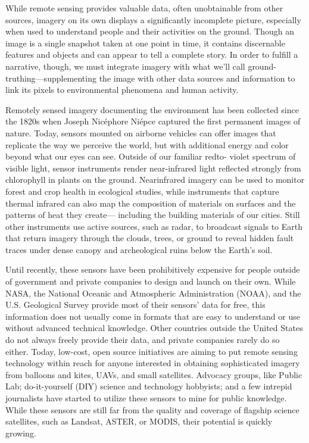 \begin{itemize}
\begin{itemized}
While remote sensing provides valuable data, often unobtainable from
other sources, imagery on its own displays a significantly incomplete picture,
especially when used to understand people and their activities on the
ground. Though an image is a single snapshot taken at one point in time, it
contains discernable features and objects and can appear to tell a complete
story. In order to fulfill a narrative, though, we must integrate imagery with
what we'll call ground-truthing—supplementing the image with other data
sources and information to link its pixels to environmental phenomena and
human activity.

Remotely sensed imagery documenting the environment has been collected
since the 1820s when Joseph Nicéphore Niépce captured the first permanent
images of nature. Today, sensors mounted on airborne vehicles can
offer images that replicate the way we perceive the world, but with additional
energy and color beyond what our eyes can see. Outside of our familiar redto-
violet spectrum of visible light, sensor instruments render near-infrared
light reflected strongly from chlorophyll in plants on the ground. Nearinfrared
imagery can be used to monitor forest and crop health in ecological
studies, while instruments that capture thermal infrared can also map
the composition of materials on surfaces and the patterns of heat they create—
including the building materials of our cities. Still other instruments
use active sources, such as radar, to broadcast signals to Earth that return
imagery through the clouds, trees, or ground to reveal hidden fault traces
under dense canopy and archeological ruins below the Earth's soil.

Until recently, these sensors have been prohibitively expensive for people
outside of government and private companies to design and launch on their
own. While NASA, the National Oceanic and Atmospheric Administration
(NOAA), and the U.S. Geological Survey provide most of their sensors' data
for free, this information does not usually come in formats that are easy to understand or use without advanced technical knowledge. Other countries
outside the United States do not always freely provide their data, and private
companies rarely do so either. Today, low-cost, open source initiatives
are aiming to put remote sensing technology within reach for anyone interested
in obtaining sophisticated imagery from balloons and kites, UAVs, and
small satellites. Advocacy groups, like Public Lab; do-it-yourself (DIY) science
and technology hobbyists; and a few intrepid journalists have started
to utilize these sensors to mine for public knowledge. While these sensors
are still far from the quality and coverage of flagship science satellites, such
as Landsat, ASTER, or MODIS, their potential is quickly growing.


\end{itemized}
\end{itemize}
